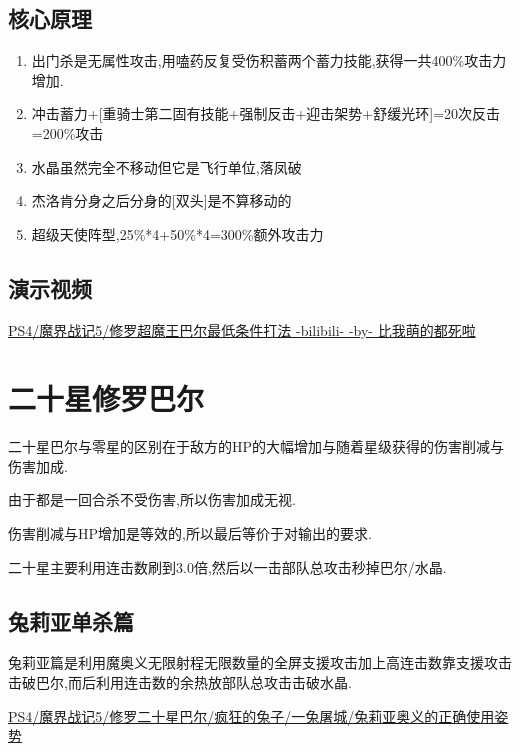 	\subsection{核心原理}

	\begin{enumerate}
		\item 出门杀是无属性攻击,用嗑药反复受伤积蓄两个蓄力技能,获得一共400\%攻击力增加.

		\item 冲击蓄力+[重骑士第二固有技能+强制反击+迎击架势+舒缓光环]=20次反击=200\%攻击

		\item 水晶虽然完全不移动但它是飞行单位,落凤破

		\item 杰洛肯分身之后分身的[双头]是不算移动的
		
		\item 超级天使阵型,25\%*4+50\%*4=300\%额外攻击力
	\end{enumerate}

	\subsection{演示视频}
	\href{http://www.bilibili.com/video/av2976870/}{PS4/魔界战记5/修罗超魔王巴尔最低条件打法 -bilibili- -by- 比我萌的都死啦}


	\newpage

	\section{二十星修罗巴尔}

	二十星巴尔与零星的区别在于敌方的HP的大幅增加与随着星级获得的伤害削减与伤害加成.

	由于都是一回合杀不受伤害,所以伤害加成无视.

	伤害削减与HP增加是等效的,所以最后等价于对输出的要求.

	二十星主要利用连击数刷到3.0倍,然后以一击部队总攻击秒掉巴尔/水晶.

	\subsection{兔莉亚单杀篇}

	兔莉亚篇是利用魔奥义无限射程无限数量的全屏支援攻击加上高连击数靠支援攻击击破巴尔,而后利用连击数的余热放部队总攻击击破水晶.

	\href{http://www.bilibili.com/video/av2989748/}{PS4/魔界战记5/修罗二十星巴尔/疯狂的兔子/一兔屠城/兔莉亚奥义的正确使用姿势}


